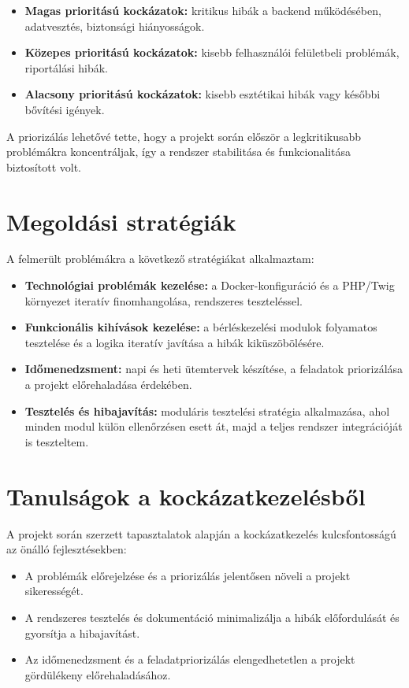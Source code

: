 \begin{itemize}
    \item \textbf{Magas prioritású kockázatok:} kritikus hibák a backend működésében, adatvesztés, biztonsági hiányosságok.
    \item \textbf{Közepes prioritású kockázatok:} kisebb felhasználói felületbeli problémák, riportálási hibák.
    \item \textbf{Alacsony prioritású kockázatok:} kisebb esztétikai hibák vagy későbbi bővítési igények.
\end{itemize}

A priorizálás lehetővé tette, hogy a projekt során először a legkritikusabb problémákra koncentráljak, 
így a rendszer stabilitása és funkcionalitása biztosított volt.

\section{Megoldási stratégiák}

A felmerült problémákra a következő stratégiákat alkalmaztam:
\begin{itemize}
    \item \textbf{Technológiai problémák kezelése:} a Docker-konfiguráció és a PHP/Twig környezet iteratív finomhangolása, rendszeres teszteléssel.
    \item \textbf{Funkcionális kihívások kezelése:} a bérléskezelési modulok folyamatos tesztelése és a logika iteratív javítása a hibák kiküszöbölésére.
    \item \textbf{Időmenedzsment:} napi és heti ütemtervek készítése, a feladatok priorizálása a projekt előrehaladása érdekében.
    \item \textbf{Tesztelés és hibajavítás:} moduláris tesztelési stratégia alkalmazása, ahol minden modul külön ellenőrzésen esett át, majd a teljes rendszer integrációját is teszteltem.
\end{itemize}

\section{Tanulságok a kockázatkezelésből}

A projekt során szerzett tapasztalatok alapján a kockázatkezelés kulcsfontosságú az önálló fejlesztésekben:
\begin{itemize}
    \item A problémák előrejelzése és a priorizálás jelentősen növeli a projekt sikerességét.
    \item A rendszeres tesztelés és dokumentáció minimalizálja a hibák előfordulását és gyorsítja a hibajavítást.
    \item Az időmenedzsment és a feladatpriorizálás elengedhetetlen a projekt gördülékeny előrehaladásához.
\end{itemize}
